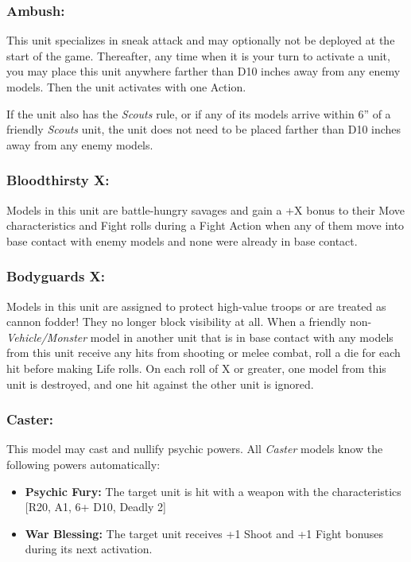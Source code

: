 \begin{multicols}{2}
\subsubsection*{Ambush:} This unit specializes in sneak attack and may optionally not be deployed at the start of the game. Thereafter, any time when it is your turn to activate a unit, you may place this unit anywhere farther than D10 inches away from any enemy models. Then the unit activates with one Action.

If the unit also has the \textit{Scouts} rule, or if any of its models arrive within 6'' of a friendly \textit{Scouts} unit, the unit does not need to be placed farther than D10 inches away from any enemy models.

\subsubsection*{Bloodthirsty X:} Models in this unit are battle-hungry savages and gain a +X bonus to their Move characteristics and Fight rolls during a Fight Action when any of them move into base contact with enemy models and none were already in base contact.

\subsubsection*{Bodyguards X:} Models in this unit are assigned to protect high-value troops or are treated as cannon fodder! They no longer block visibility at all. When a friendly non-\textit{Vehicle/Monster} model in another unit that is in base contact with any models from this unit receive any hits from shooting or melee combat, roll a die for each hit before making Life rolls. On each roll of X or greater, one model from this unit is destroyed, and one hit against the other unit is ignored.

\subsubsection*{Caster:} This model may cast and nullify psychic powers. All \textit{Caster} models know the following powers automatically:

\begin{itemize}
    \item \textbf{Psychic Fury:} The target unit is hit with a weapon with the characteristics [R20, A1, 6+ D10, Deadly 2]
    \item \textbf{War Blessing:} The target unit receives +1 Shoot and +1 Fight bonuses during its next activation.
\end{itemize}


\end{multicols}
